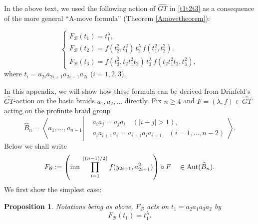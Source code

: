 \documentclass[a4paper,10pt,reqno]{amsart}
\newcommand\FB{F_{\mathcal{B}}}
\newcommand\GT{\widehat{GT}}
\newtheorem{prop}[thm]{Proposition}
\begin{document}
In the above text, we used the following action of 
$\GT$ in \eqref{t1t2t3} as a consequence of the
more general ``A-move formula''  
(Theorem \ref{Amovetheorem}):

\begin{equation}\label{Appt1t2t3}
\begin{cases}
F_{\mathcal{B}}(t_1)=t_1^\lambda,
\\
F_{\mathcal{B}}(t_2)=f(t_2^2,t_1^2)\,t_2^\lambda \,f(t_1^2,t_2^2),
\\
F_{\mathcal{B}}(t_3)=f(t_3^2,t_2t_1^2t_2)\,t_3^\lambda \,f(t_2t_1^2t_2,t_3^2),
\end{cases}
\end{equation}
where $t_i=a_{2i}a_{2i+1}a_{2i-1}a_{2i}$ ($i=1,2,3$).

In this appendix, we will show how these formula can
be derived from Drinfeld's $\GT$-action on the basic
braids $a_1,a_2,\dots$ directly.
Fix $n\ge 4$ and $F=(\lambda,f)\in\GT$ acting on the profinite
braid group 
$$
\widehat{B}_n=\left\langle 
a_1,\dots,a_{n-1}\left|
\begin{matrix} 
&a_ia_j=a_ja_i\quad (|i-j|>1), \\
&a_ia_{i+1}a_i=a_{i+1}a_ia_{i+1}\quad (i=1,\dots,n-2)
\end{matrix}
\right.\right\rangle.
$$
Below we shall write 
$$
\FB:=\left({\rm inn}\,\prod_{i=1}^{\lfloor (n-1)/2 \rfloor}
f(y_{2i+1},a_{2i+1}^2)
\right)\circ F
\quad\in  \mathrm{Aut}(\widehat{B}_n).
$$
We first show the simplest case:
\begin{prop}
Notations being as above,
$F_{\mathcal{B}}$ acts on $t_1=a_2a_1a_3a_2$ by
\begin{equation}
\FB(t_1)= t_1^\lambda.
\end{equation}

\end{prop}
\end{document}
